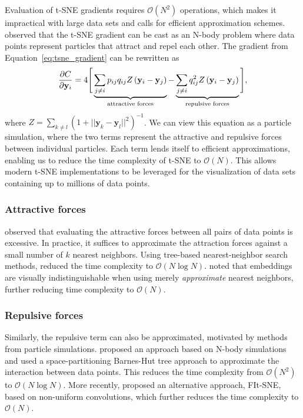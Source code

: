 \documentclass[article]{jss}
\begin{document}
Evaluation of t-SNE gradients requires $\mathcal{O}(N^2)$ operations,
which makes it impractical with large data sets and
calls for efficient approximation schemes.
\citet{van2014accelerating} observed that the t-SNE gradient can be cast as an
N-body problem where data points represent particles that attract and repel each
other. The gradient from Equation~\ref{eq:tsne_gradient} can be rewritten as
\begin{equation}
\frac{\partial C}{\partial \mathbf{y}_i} = 4 \Bigg [
\underbrace{\sum_{j \neq i} p_{ij} q_{ij} Z \left ( \mathbf{y}_i - \mathbf{y}_j \right )}_{\text{attractive forces}}  -
\underbrace{\sum_{j \neq i} q_{ij}^2 Z \left ( \mathbf{y}_i - \mathbf{y}_j \right )}_{\text{repulsive forces}}
\Bigg ], \label{eq:grad_attr_rep} \notag
\end{equation}
where $Z = \sum_{k \neq l}\left ( 1 + || \mathbf{y}_k - \mathbf{y}_l ||^2 \right
)^{-1}$. We can view this equation as a particle simulation, where the
two terms represent the attractive and repulsive forces between individual
particles. Each term lends itself to efficient approximations, enabling us to
reduce the time complexity of t-SNE to $\mathcal{O}(N)$. This allows modern
t-SNE implementations to be leveraged for the visualization of data sets
containing up to millions of data points.

\subsubsection*{Attractive forces}
\citet{van2014accelerating} observed that evaluating the attractive forces
between all pairs of data points is excessive. In practice, it 
suffices to approximate the attraction forces against a small number of
$k$ nearest neighbors. Using tree-based nearest-neighbor search methods,
\citet{van2014accelerating} reduced the time complexity to $\mathcal{O}(N \log
N)$. \citet{linderman2019fast} noted that embeddings
are visually indistinguishable when using merely \textit{approximate} nearest
neighbors, further reducing time complexity to $\mathcal{O}(N)$.

\subsubsection*{Repulsive forces}
Similarly, the repulsive term can also be approximated, motivated by methods from
particle simulations. \citet{van2014accelerating} proposed an approach based on
N-body simulations and used a space-partitioning Barnes-Hut tree approach to
approximate the interaction between data points. This reduces the time
complexity from $\mathcal{O}(N^2)$ to $\mathcal{O}(N \log N)$. More recently,
\citet{linderman2019fast} proposed an alternative approach, FIt-SNE, based on
non-uniform convolutions, which further reduces the time complexity to
$\mathcal{O}(N)$.
\end{document}
